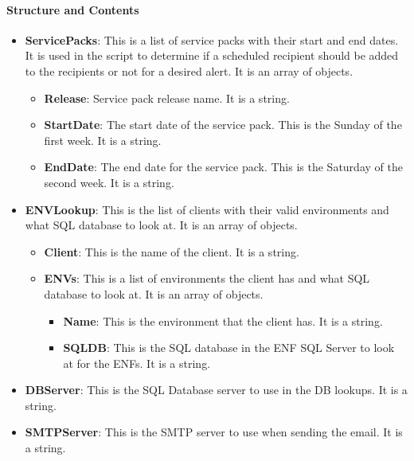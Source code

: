 \documentclass[a4paper,12pt]{report}
\begin{document}
\paragraph*{Structure and Contents}
 \par
\begin{itemize}
\item \textbf{ServicePacks}: This is a list of service packs with their start and end dates. It is used in the script to determine if a scheduled recipient should be added to the recipients or not for a desired alert. It is an array of objects. \par
\begin{itemize}
\item \textbf{Release}: Service pack release name. It is a string. \par
\item \textbf{StartDate}: The start date of the service pack. This is the Sunday of the first week. It is a string. \par
\item \textbf{EndDate}: The end date for the service pack. This is the Saturday of the second week. It is a string. \par
\end{itemize}
\item \textbf{ENVLookup}: This is the list of clients with their valid environments and what SQL database to look at. It is an array of objects. \par
\begin{itemize}
\item \textbf{Client}: This is the name of the client. It is a string. \par
\item \textbf{ENVs}: This is a list of environments the client has and what SQL database to look at. It is an array of objects. \par
\begin{itemize}
\item \textbf{Name}: This is the environment that the client has. It is a string. \par
\item \textbf{SQLDB}: This is the SQL database in the ENF SQL Server to look at for the ENFs. It is a string. \par
\end{itemize}
\end{itemize}
\item \textbf{DBServer}: This is the SQL Database server to use in the DB lookups. It is a string. \par
\item \textbf{SMTPServer}: This is the SMTP server to use when sending the email. It is a string. \par
\end{itemize}
\end{document}
